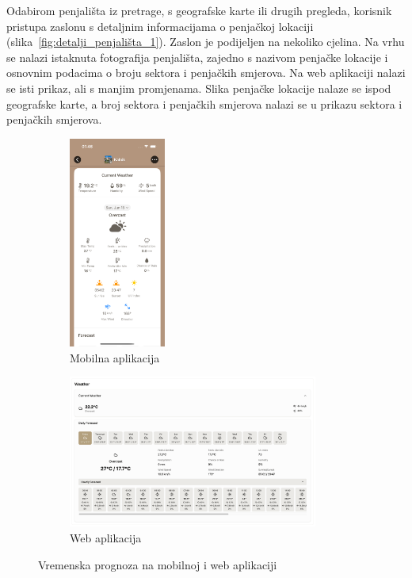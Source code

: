 Odabirom penjališta iz pretrage, s geografske karte ili drugih pregleda, korisnik pristupa zaslonu s detaljnim informacijama o penjačkoj lokaciji (slika~\ref{fig:detalji_penjališta_1}). Zaslon je podijeljen na nekoliko cjelina. Na vrhu se nalazi istaknuta fotografija penjališta, zajedno s nazivom penjačke lokacije i osnovnim podacima o broju sektora i penjačkih smjerova. Na web aplikaciji nalazi se isti prikaz, ali s manjim promjenama. Slika penjačke lokacije nalaze se ispod geografske karte, a broj sektora i penjačkih smjerova nalazi se u prikazu sektora i penjačkih smjerova.

\begin{figure}[H]
    \centering
    \begin{subfigure}[b]{\textwidth}
        \centering
        \includegraphics[width=0.35\textwidth]{images/implementacija/crag-details/crag-weather-1.png}
        \caption{Mobilna aplikacija}
        \label{fig:vremenska_prognoza_mob}
    \end{subfigure}
    \hfill
    \begin{subfigure}[b]{\textwidth}
        \centering
        \includegraphics[width=0.9\textwidth]{images/implementacija/web/crag-details/crag-weather.png}
        \caption{Web aplikacija}
        \label{fig:vremenska_prognoza_web}
    \end{subfigure}
    \caption{Vremenska prognoza na mobilnoj i web aplikaciji}
    \label{fig:vremenska_prognoza}
\end{figure}

